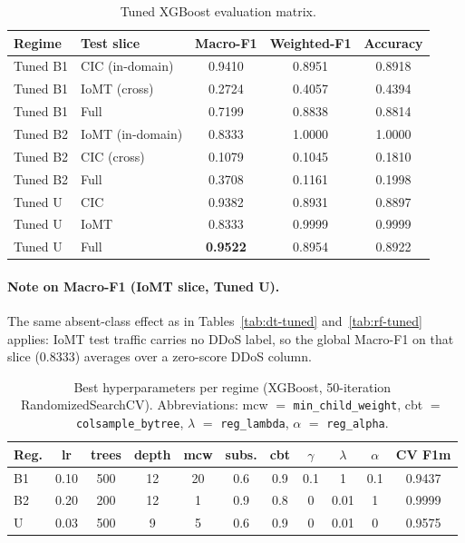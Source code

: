 \begin{table}[H]
\centering
\caption{Tuned XGBoost evaluation matrix.}
\label{tab:xgb-tuned}
\small
\begin{tabular}{@{}l l c c c@{}}
\toprule
\textbf{Regime} & \textbf{Test slice} & \textbf{Macro-F1} & \textbf{Weighted-F1} & \textbf{Accuracy} \\
\midrule
Tuned B1 & CIC (in-domain)  & 0.9410 & 0.8951 & 0.8918 \\
Tuned B1 & IoMT (cross)     & 0.2724 & 0.4057 & 0.4394 \\
Tuned B1 & Full             & 0.7199 & 0.8838 & 0.8814 \\
\midrule
Tuned B2 & IoMT (in-domain) & 0.8333 & 1.0000 & 1.0000 \\
Tuned B2 & CIC (cross)      & 0.1079 & 0.1045 & 0.1810 \\
Tuned B2 & Full             & 0.3708 & 0.1161 & 0.1998 \\
\midrule
Tuned U  & CIC              & 0.9382 & 0.8931 & 0.8897 \\
Tuned U  & IoMT             & 0.8333 & 0.9999 & 0.9999 \\
Tuned U  & Full             & \textbf{0.9522} & 0.8954 & 0.8922 \\
\bottomrule
\end{tabular}
\end{table}

\paragraph{Note on Macro-F1 (IoMT slice, Tuned U).}
The same absent-class effect as in Tables~\ref{tab:dt-tuned} and~\ref{tab:rf-tuned} applies: IoMT test traffic carries no DDoS label, so the global Macro-F1 on that slice (0.8333) averages over a zero-score DDoS column.

\begin{table}[H]
\centering
\caption{Best hyperparameters per regime (XGBoost, 50-iteration RandomizedSearchCV). Abbreviations: mcw $=$ \texttt{min\_child\_weight}, cbt $=$ \texttt{colsample\_bytree}, $\lambda$ $=$ \texttt{reg\_lambda}, $\alpha$ $=$ \texttt{reg\_alpha}.}
\label{tab:xgb-best-params}
\scriptsize
\begin{tabular}{@{}l c c c c c c c c c c@{}}
\toprule
\textbf{Reg.} & \textbf{lr} & \textbf{trees} & \textbf{depth} & \textbf{mcw} & \textbf{subs.} & \textbf{cbt} & $\gamma$ & $\lambda$ & $\alpha$ & \textbf{CV F1m} \\
\midrule
B1 & 0.10 & 500 & 12 & 20 & 0.6 & 0.9 & 0.1 & 1 & 0.1 & 0.9437 \\
B2 & 0.20 & 200 & 12 & 1  & 0.9 & 0.8 & 0 & 0.01 & 1 & 0.9999 \\
U  & 0.03 & 500 & 9  & 5  & 0.6 & 0.9 & 0 & 0.01 & 0 & 0.9575 \\
\bottomrule
\end{tabular}
\end{table}

